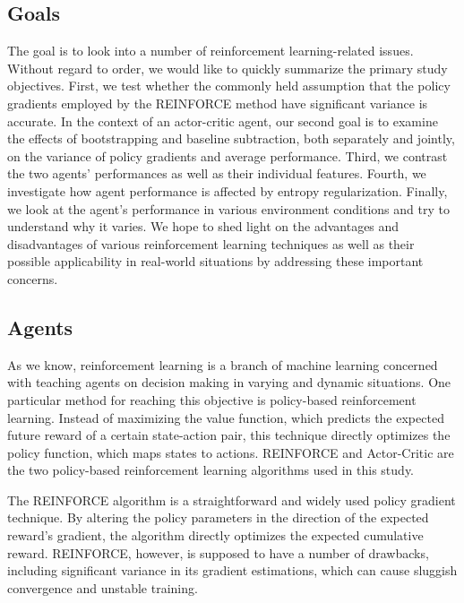 \documentclass{article}
\begin{document}
\subsection{Goals}
\label{I-Goals}
The goal is to look into a number of reinforcement learning-related issues.
Without regard to order, we would like to quickly summarize the primary study objectives.
First, we test whether the commonly held assumption that the policy gradients employed by the REINFORCE method have significant variance is accurate. \cite{Sutton} %
In the context of an actor-critic agent, our second goal is to examine the effects of bootstrapping and baseline subtraction, both separately and jointly, on the variance of policy gradients and average performance.
Third, we contrast the two agents' performances as well as their individual features.
Fourth, we investigate how agent performance is affected by entropy regularization.
Finally, we look at the agent's performance in various environment conditions and try to understand why it varies. 
We hope to shed light on the advantages and disadvantages of various reinforcement learning techniques as well as their possible applicability in real-world situations by addressing these important concerns.

\subsection{Agents}
\label{I-Agents}
As we know, reinforcement learning is a branch of machine learning concerned with teaching agents on decision making in varying and dynamic situations.
One particular method for reaching this objective is policy-based reinforcement learning. 
Instead of maximizing the value function, which predicts the expected future reward of a certain state-action pair, this technique directly optimizes the policy function, which maps states to actions. 
REINFORCE and Actor-Critic are the two policy-based reinforcement learning algorithms used in this study.

The REINFORCE algorithm is a straightforward and widely used policy gradient technique.
By altering the policy parameters in the direction of the expected reward's gradient, the algorithm directly optimizes the expected cumulative reward.
REINFORCE, however, is supposed to have a number of drawbacks, including significant variance in its gradient estimations, which can cause sluggish convergence and unstable training.
\end{document}
